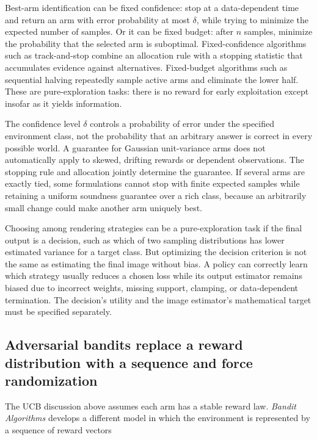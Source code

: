 Best-arm identification can be fixed confidence: stop at a data-dependent time and return an arm with error probability at most \(\delta\), while trying to minimize the expected number of samples. Or it can be fixed budget: after \(n\) samples, minimize the probability that the selected arm is suboptimal. Fixed-confidence algorithms such as track-and-stop combine an allocation rule with a stopping statistic that accumulates evidence against alternatives. Fixed-budget algorithms such as sequential halving repeatedly sample active arms and eliminate the lower half. These are pure-exploration tasks: there is no reward for early exploitation except insofar as it yields information.

The confidence level \(\delta\) controls a probability of error under the specified environment class, not the probability that an arbitrary answer is correct in every possible world. A guarantee for Gaussian unit-variance arms does not automatically apply to skewed, drifting rewards or dependent observations. The stopping rule and allocation jointly determine the guarantee. If several arms are exactly tied, some formulations cannot stop with finite expected samples while retaining a uniform soundness guarantee over a rich class, because an arbitrarily small change could make another arm uniquely best.

Choosing among rendering strategies can be a pure-exploration task if the final output is a decision, such as which of two sampling distributions has lower estimated variance for a target class. But optimizing the decision criterion is not the same as estimating the final image without bias. A policy can correctly learn which strategy usually reduces a chosen loss while its output estimator remains biased due to incorrect weights, missing support, clamping, or data-dependent termination. The decision's utility and the image estimator's mathematical target must be specified separately.

\subsection{Adversarial bandits replace a reward distribution with a sequence and force randomization}\label{02-foundations-ii-ch029-adversarial-bandits-replace-a-reward-distribution-with-a-sequence-and-force-randomization}

The UCB discussion above assumes each arm has a stable reward law. \emph{Bandit Algorithms} develops a different model in which the environment is represented by a sequence of reward vectors

